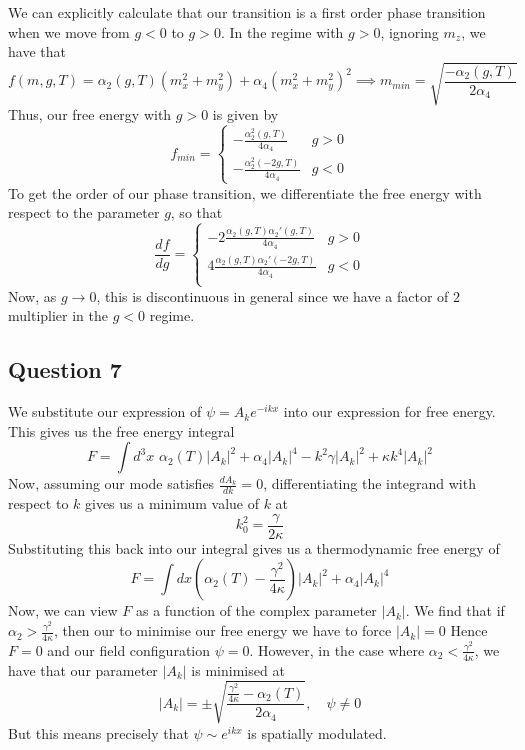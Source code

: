 \documentclass[11pt, oneside]{article}   	%
\begin{document}
We can explicitly calculate that our transition is a first order phase transition when we move from $g< 0$ to $g > 0$. In the regime with $g > 0$, ignoring $m_z$, we have that 
\[ 
	f(m, g, T) = \alpha_2( g, T) (m_x^2 + m_y^2) + \alpha_4 ( m_x^2 + m_y^2)^2 \implies m_{min} = \sqrt{ \frac{  - \alpha_2 ( g, T ) }{ 2 \alpha_4 } } 
\] Thus, our free energy with $g > 0 $ is given by 
\[ 
	f_{min} = \begin{cases}  - \frac{ \alpha_2^2 ( g, T ) }{ 4 \alpha_4 }  & g > 0 \\
	         - \frac{ \alpha_2^2 (  - 2 g, T ) }{ 4 \alpha_4 } & g < 0 
	         \end{cases}
\] To get the order of our phase transition, we differentiate the free energy with respect to the parameter $g$, so that 
\[ 
	\frac{ df}{ dg} = \begin{cases} 
		 - 2 \frac{ \alpha_2 (g, T ) \alpha_2' ( g, T ) }{ 4 \alpha_4 } & g > 0 \\
		  4 \frac{ \alpha_2 (g, T ) \alpha_2' ( -2g, T ) }{ 4 \alpha_4 } & g < 0 \\
\end{cases} 
\] 
Now, as $g \rightarrow 0$, this is discontinuous in general since we have a factor of $2$ multiplier in the $g < 0$ regime. 

\pagebreak 

\subsection{Question 7} 
We substitute our expression of $\psi = A_k e^{ - ikx} $ into our expression for free energy. This gives us the free energy integral 
\[ 
	F = \int d^3 x\, \,  \alpha_2 (T) |A_k|^2 + \alpha_4 |A_k|^4  - k^2 \gamma |A_k|^2 + \kappa k^4 |A_k|^2
\] Now, assuming our mode satisfies $\frac{ dA_k }{ dk }  = 0$, differentiating the integrand with respect to $k$ gives us a minimum value of $ k$ at 
\[ 
	k_0^2 = \frac{ \gamma}{ 2 \kappa } 
\] Substituting this back into our integral gives us a thermodynamic free energy of 
\[ 
	F  = \int dx \left( \alpha_2( T) - \frac{ \gamma^2}{ 4 \kappa } \right) |A_k|^2 + \alpha_4 |A_k|^4 
\]  
Now, we can view $F$ as a function of the complex parameter $|A_k|$. We find that if $\alpha_2 > \frac{ \gamma^ 2}{ 4 \kappa } $, then our to minimise our free energy we have to force $|A_k| = 0 $ Hence $F = 0$ and our field configuration $\psi = 0$. However, in the case where $\alpha_2 <  \frac{ \gamma^ 2}{ 4 \kappa} $, we have that our parameter $|A_k|$ is minimised at \[ 
|A_k | =  \pm \sqrt { \frac{ \frac{ \gamma^ 2}{ 4 \kappa} - \alpha_2 ( T ) }{ 2 \alpha_4 }  }  , \quad \psi \neq 0 
\] But this means precisely that $\psi \sim e^{ ikx} $ is spatially modulated.
\end{document}
